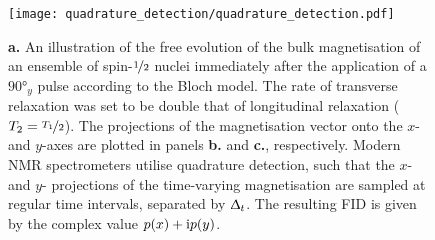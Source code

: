 \begin{figure}
    \centering
    \texttt{[image: quadrature\_detection/quadrature\_detection.pdf]}
    \caption[
        An illustration of the free evolution of the bulk
        magnetisation of an ensemble of spin-$\nicefrac{1}{2}$ nuclei
        according to the Bloch model.
    ]{
        \textbf{a.} An illustration of the free evolution of the bulk
        magnetisation of an ensemble of spin-$\nicefrac{1}{2}$ nuclei
        immediately after the application of a $\ang{90}_y$ pulse according to
        the Bloch model. The rate of transverse relaxation was set to be double
        that of longitudinal relaxation ($T_2 = \nicefrac{T_1}{2}$).
        The projections of the magnetisation vector onto the
        $x$- and  $y$-axes are plotted in panels \textbf{b.} and \textbf{c.},
        respectively. Modern \acs{NMR} spectrometers utilise quadrature
        detection, such that the $x$- and  $y$- projections of the time-varying
        magnetisation are sampled at regular time intervals, separated by
        $\Updelta_t$.  The resulting \acs{FID} is given by the complex value $p(x) +
        \mathrm{i} p(y)$.
    }\label{fig:quadrature}
\end{figure}

